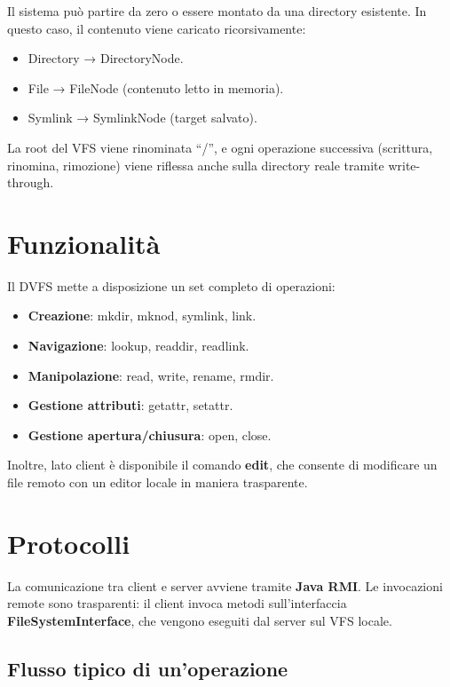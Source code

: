 \documentclass[
]{article}
\providecommand{\tightlist}{%
  \setlength{\itemsep}{0pt}\setlength{\parskip}{0pt}}
\begin{document}
Il sistema può partire da zero o essere montato da una directory
esistente. In questo caso, il contenuto viene caricato ricorsivamente:

\begin{itemize}
\tightlist
\item
  Directory → DirectoryNode.
\item
  File → FileNode (contenuto letto in memoria).
\item
  Symlink → SymlinkNode (target salvato).
\end{itemize}

La root del VFS viene rinominata ``/'', e ogni operazione successiva
(scrittura, rinomina, rimozione) viene riflessa anche sulla directory
reale tramite write-through.

\section{Funzionalità}\label{funzionalituxe0}

Il DVFS mette a disposizione un set completo di operazioni:

\begin{itemize}
\tightlist
\item
  \textbf{Creazione}: mkdir, mknod, symlink, link.
\item
  \textbf{Navigazione}: lookup, readdir, readlink.
\item
  \textbf{Manipolazione}: read, write, rename, rmdir.
\item
  \textbf{Gestione attributi}: getattr, setattr.
\item
  \textbf{Gestione apertura/chiusura}: open, close.
\end{itemize}

Inoltre, lato client è disponibile il comando \textbf{edit}, che
consente di modificare un file remoto con un editor locale in maniera
trasparente.

\section{Protocolli}\label{protocolli}

La comunicazione tra client e server avviene tramite \textbf{Java RMI}.
Le invocazioni remote sono trasparenti: il client invoca metodi
sull'interfaccia \textbf{FileSystemInterface}, che vengono eseguiti dal
server sul VFS locale.

\subsection{Flusso tipico di
un'operazione}\label{flusso-tipico-di-unoperazione}
\end{document}
